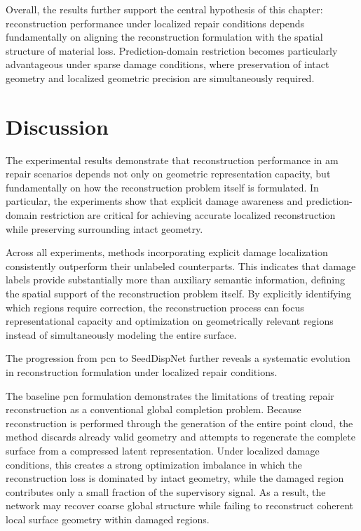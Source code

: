 Overall, the results further support the central hypothesis of this chapter: reconstruction performance under localized repair conditions depends fundamentally on aligning the reconstruction formulation with the spatial structure of material loss. Prediction-domain restriction becomes particularly advantageous under sparse damage conditions, where preservation of intact geometry and localized geometric precision are simultaneously required.

\section{Discussion}
\label{sec:discussion}

The experimental results demonstrate that reconstruction performance in \ac{am} repair scenarios depends not only on geometric representation capacity, but fundamentally on how the reconstruction problem itself is formulated. In particular, the experiments show that explicit damage awareness and prediction-domain restriction are critical for achieving accurate localized reconstruction while preserving surrounding intact geometry.

Across all experiments, methods incorporating explicit damage localization consistently outperform their unlabeled counterparts. This indicates that damage labels provide substantially more than auxiliary semantic information, defining the spatial support of the reconstruction problem itself. By explicitly identifying which regions require correction, the reconstruction process can focus representational capacity and optimization on geometrically relevant regions instead of simultaneously modeling the entire surface.

The progression from \ac{pcn} to SeedDispNet further reveals a systematic evolution in reconstruction formulation under localized repair conditions.

The baseline \ac{pcn} formulation demonstrates the limitations of treating repair reconstruction as a conventional global completion problem. Because reconstruction is performed through the generation of the entire point cloud, the method discards already valid geometry and attempts to regenerate the complete surface from a compressed latent representation. Under localized damage conditions, this creates a strong optimization imbalance in which the reconstruction loss is dominated by intact geometry, while the damaged region contributes only a small fraction of the supervisory signal. As a result, the network may recover coarse global structure while failing to reconstruct coherent local surface geometry within damaged regions.

